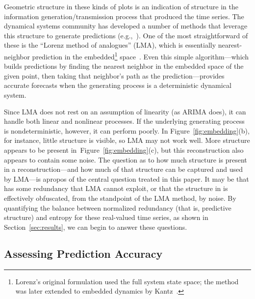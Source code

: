 Geometric structure in these kinds of plots is an indication of
structure in the information generation/transmission process that
produced the time series.  The dynamical systems community has
developed a number of methods that leverage this structure to generate
predictions (e.g.,~\cite{weigend-book,casdagli-eubank92,Smith199250}).
One of the most straightforward of these is the ``Lorenz method of
analogues'' (LMA), which is essentially nearest-neighbor prediction in
the embedded\footnote{Lorenz's original formulation used the full
  system state space; the method was later extended to embedded
  dynamics by Kantz~\cite{kantz97}.}
space~\cite{lorenz-analogues}.  Even this simple algorithm---which
builds predictions by finding the nearest neighbor in the embedded
space of the given point, then taking that neighbor's path as the
prediction---provides accurate forecasts when the generating process
is a deterministic dynamical system.  

Since LMA does not rest on an assumption of linearity (as ARIMA does),
it can handle both linear and nonlinear processes.  If the underlying
generating process is nondeterministic, however, it can perform
poorly.  In Figure~\ref{fig:embedding}(b), for instance, little
structure is visible, so LMA may not work well.  More structure
appears to be present in~Figure~\ref{fig:embedding}(c), but this
reconstruction also appears to contain some noise.  The question as to
how much structure is present in a reconstruction---and how much of
that structure can be captured and used by LMA---is apropos of the
central question treated in this paper.  It may be that \gcc has some
redundancy that LMA cannot exploit, or that the structure in \svdfive
is effectively obfuscated, from the standpoint of the LMA method, by
noise.  By quantifying the balance between normalized redundancy (that
is, predictive structure) and entropy for these real-valued time
series, as shown in Section~\ref{sec:results}, we can begin to answer
these questions.


\subsection{Assessing Prediction Accuracy}
\label{sec:accuracy}

